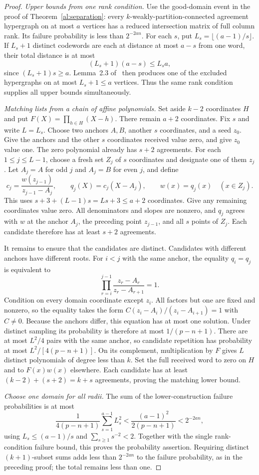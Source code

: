 \documentclass[11pt,letterpaper]{article}
\theoremstyle{definition}
\theoremstyle{remark}
\begin{document}
\begin{proof}
\emph{Upper bounds from one rank condition.}
Use the good-domain event in the proof of Theorem~\ref{al:separation}: every
$k$-weakly-partition-connected agreement hypergraph on at most $a$
vertices has a reduced intersection matrix of full column rank.
Its failure probability is less than $2^{-2an}$.
For each $s$, put $L_s=\lfloor(a-1)/s\rfloor$.
If $L_s+1$ distinct codewords are each at distance at most $a-s$
from one word, their total distance is at most
\[
 (L_s+1)(a-s)\le L_s a,
\]
since $(L_s+1)s\ge a$.
Lemma~2.3 of~\cite{aggllz} then produces one of the excluded
hypergraphs on at most $L_s+1\le a$ vertices.
Thus the same rank condition supplies all upper bounds simultaneously.

\emph{Matching lists from a chain of affine polynomials.}
Set aside $k-2$ coordinates $H$ and put $F(X)=\prod_{h\in H}(X-h)$.
There remain $a+2$ coordinates. Fix $s$ and write $L=L_s$.
Choose two anchors $A,B$, another $s$ coordinates, and a seed $z_0$.
Give the anchors and the other $s$ coordinates received value zero,
and give $z_0$ value one. The zero polynomial already has $s+2$ agreements.
For each $1\le j\le L-1$, choose a fresh set $Z_j$ of $s$ coordinates
and designate one of them $z_j$.
Let $A_j=A$ for odd $j$ and $A_j=B$ for even $j$, and define
\[
 c_j=\frac{w(z_{j-1})}{z_{j-1}-A_j},\qquad
 q_j(X)=c_j(X-A_j),\qquad
 w(x)=q_j(x)\quad(x\in Z_j).
\]
This uses $s+3+(L-1)s=Ls+3\le a+2$ coordinates.
Give any remaining coordinates value zero.
All denominators and slopes are nonzero, and $q_j$ agrees with $w$
at the anchor $A_j$, the preceding point $z_{j-1}$, and all $s$ points
of $Z_j$. Each candidate therefore has at least $s+2$ agreements.

It remains to ensure that the candidates are distinct. Candidates with
different anchors have different roots. For $i<j$ with the same anchor,
the equality $q_i=q_j$ is equivalent to
\[
 \prod_{r=i}^{j-1}\frac{z_r-A_r}{z_r-A_{r+1}}=1.
\]
Condition on every domain coordinate except $z_i$.
All factors but one are fixed and nonzero, so the equality takes the form
$C(z_i-A_i)/(z_i-A_{i+1})=1$ with $C\ne0$.
Because the anchors differ, this equation has at most one solution.
Under distinct sampling its probability is therefore at most
$1/(p-n+1)$. There are at most $L^2/4$ pairs with the same anchor,
so candidate repetition has probability at most $L^2/[4(p-n+1)]$.
On its complement, multiplication by $F$ gives $L$ distinct polynomials
of degree less than $k$. Set the full received word to zero on $H$ and
to $F(x)w(x)$ elsewhere. Each candidate has at least
$(k-2)+(s+2)=k+s$ agreements, proving the matching lower bound.

\emph{Choose one domain for all radii.}
The sum of the lower-construction failure probabilities is at most
\[
 \frac{1}{4(p-n+1)}\sum_{s=1}^{a-1}L_s^2
 <\frac{(a-1)^2}{2(p-n+1)}<2^{-2an},
\]
using $L_s\le(a-1)/s$ and $\sum_{s\ge1}s^{-2}<2$.
Together with the single rank-condition failure bound, this proves the
probability assertion. Requiring distinct $(k+1)$-subset sums adds less
than $2^{-2an}$ to the failure probability, as in the preceding proof;
the total remains less than one.
\end{proof}
\end{document}
